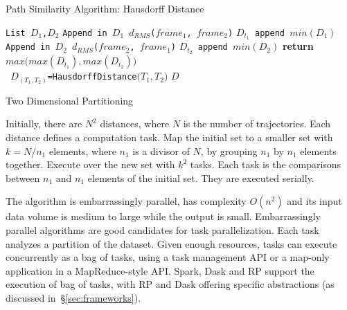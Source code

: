 \begin{algorithm}[t]
    \scriptsize
    \caption{Path Similarity Algorithm: Hausdorff Distance}
    \label{alg:hausdorff}
    \begin{algorithmic}[1]
        \State \texttt{List $D_1$,$D_2$}
        \State \texttt{Append in $D_1$ $d_{RMS}$($frame_1$, $frame_2$)}
        \EndFor
        \State \texttt{$D_{t_1}$ append $min(D_1)$}
        \EndFor
        \State \texttt{Append in $D_2$ $d_{RMS}$($frame_2$, $frame_1$)}
        \EndFor
        \State\texttt{$D_{t_2}$ append $min(D_2)$}
        \EndFor
        \State \textbf{return} $max\Big(max(D_{t_1}),max(D_{t_2})\Big)$
        \EndProcedure
        \\
        \State \texttt{ $D_{( T_1,T_2 )}$=HausdorffDistance$\Big( T_1,T_2 \Big)$}
        \EndFor
        \EndFor
        \State \Return $D$
        \EndProcedure
    \end{algorithmic}
\end{algorithm}


\begin{algorithm}[t]
    \scriptsize
    \caption{Two Dimensional Partitioning}
    \label{alg:partition}
    \begin{algorithmic}[1]
        \State Initially, there are $N^2$ distances, where $N$ is the number of trajectories.
        Each distance defines a computation task.
        \State Map the initial set to a smaller set with $k=N/n_1$ elements, where $n_1$ is a divisor of $N$, by grouping $n_1$ by $n_1$ elements together.
        \State Execute over the new set with $k^2$ tasks.
        Each task is the comparisons between $n_1$ and $n_1$  elements of the initial set.
        They are executed serially.
    \end{algorithmic}
\end{algorithm}

The algorithm is embarrassingly parallel, has complexity $O(n^2)$ and its input
data volume is medium to large while the output is small.
Embarrassingly parallel algorithms are good candidates for task parallelization.
Each task analyzes a partition of the dataset. Given
enough resources, tasks can execute concurrently as a bag of tasks, using a task
management API or a map-only application in a MapReduce-style API. Spark, Dask
and RP support the execution of bag of tasks, with RP and
Dask offering specific abstractions (as discussed in~\S\ref{sec:frameworks}).

